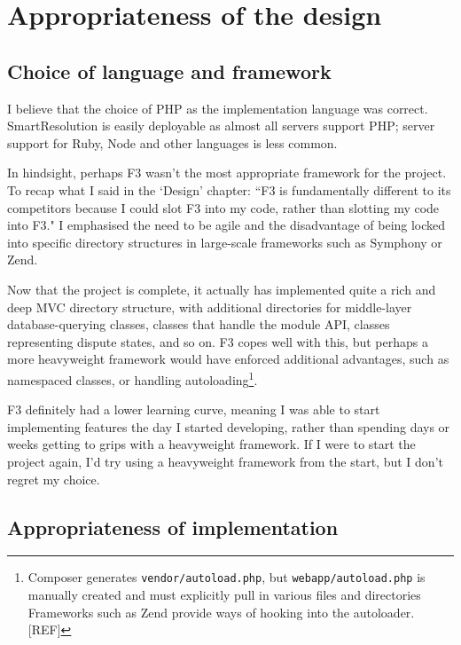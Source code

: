 \section{Appropriateness of the design}


\subsection{Choice of language and framework}

I believe that the choice of PHP as the implementation language was correct. SmartResolution is easily deployable as almost all servers support PHP; server support for Ruby, Node and other languages is less common.

In hindsight, perhaps F3 wasn't the most appropriate framework for the project. To recap what I said in the `Design' chapter: ``F3 is fundamentally different to its competitors because I could slot F3 into my code, rather than slotting my code into F3." I emphasised the need to be agile and the disadvantage of being locked into specific directory structures in large-scale frameworks such as Symphony or Zend.

Now that the project is complete, it actually has implemented quite a rich and deep MVC directory structure, with additional directories for middle-layer database-querying classes, classes that handle the module API, classes representing dispute states, and so on. F3 copes well with this, but perhaps a more heavyweight framework would have enforced additional advantages, such as namespaced classes, or handling autoloading\footnote{Composer generates \lstinline{vendor/autoload.php}, but \lstinline{webapp/autoload.php} is manually created and must explicitly pull in various files and directories Frameworks such as Zend provide ways of hooking into the autoloader. [REF]}. %

F3 definitely had a lower learning curve, meaning I was able to start implementing features the day I started developing, rather than spending days or weeks getting to grips with a heavyweight framework. If I were to start the project again, I'd try using a heavyweight framework from the start, but I don't regret my choice.

\subsection{Appropriateness of implementation}

